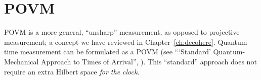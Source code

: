 \section{POVM}\label{sec:hist:povm}

POVM is
a more general, ``unsharp'' measurement, as opposed to projective measurement;
a concept we have reviewed in Chapter~\ref{ch:decohere}.
Quantum time measurement can be formulated as a POVM
(see ```Standard' Quantum-Mechanical Approach to Times of Arrival'', \cite[Ch. 10]{TQM1}).
This ``standard'' approach does not require an extra Hilbert space \emph{for the clock}.
